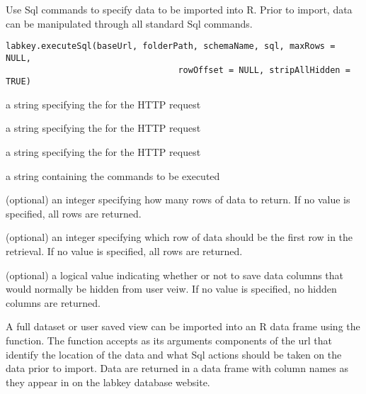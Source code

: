 \begin{Description}\relax
Use Sql commands to specify data to be imported into R. Prior to import, data can
be manipulated through all standard Sql commands.
\end{Description}
\begin{Usage}
\begin{verbatim}
labkey.executeSql(baseUrl, folderPath, schemaName, sql, maxRows = NULL, 
                                  rowOffset = NULL, stripAllHidden = TRUE)
\end{verbatim}
\end{Usage}
\begin{Arguments}
\begin{ldescription}
\item[\code{baseUrl}] a string specifying the for the HTTP request
\item[\code{folderPath}] a string specifying the  for the HTTP request
\item[\code{schemaName}] a string specifying the   for the HTTP request
\item[\code{sql}] a string containing the  commands to be executed
\item[\code{maxRows}] (optional) an integer specifying how many rows of data to return. If no value is specified, all rows are returned.
\item[\code{rowOffset}] (optional) an integer specifying which row of data should be the first row in the retrieval. 
If no value is specified, all rows are returned.
\item[\code{stripAllHidden}] (optional) a logical value indicating whether or not to save data columns that would 
normally be hidden from user veiw. If no value is specified, no hidden columns are returned.
\end{ldescription}
\end{Arguments}
\begin{Details}\relax
A full dataset or user saved view can be imported into an R data frame using the 
function. The function accepts as its arguments components of the url that identify the location of the
data and what Sql actions should be taken on the data prior to import. Data are returned in a data frame
with column names as they appear in on the labkey database website.
\end{Details}
